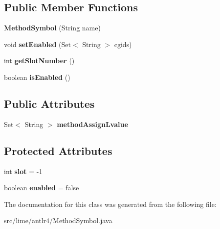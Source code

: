 \subsection*{Public Member Functions}
\begin{DoxyCompactItemize}
\item 
\mbox{\label{classlime_1_1antlr4_1_1MethodSymbol_aef5560b833c2ba287a4b766de2a9ec62}} 
{\bfseries Method\+Symbol} (String name)
\item 
\mbox{\label{classlime_1_1antlr4_1_1MethodSymbol_ae2a590dd58724fc164ea49115989b15a}} 
void {\bfseries set\+Enabled} (Set$<$ String $>$ cgids)
\item 
\mbox{\label{classlime_1_1antlr4_1_1MethodSymbol_aa6379275becc3c4d8136b96be37a0f9d}} 
int {\bfseries get\+Slot\+Number} ()
\item 
\mbox{\label{classlime_1_1antlr4_1_1MethodSymbol_aaf32f229957e563ceeb098b8b7eb74be}} 
boolean {\bfseries is\+Enabled} ()
\end{DoxyCompactItemize}
\subsection*{Public Attributes}
\begin{DoxyCompactItemize}
\item 
\mbox{\label{classlime_1_1antlr4_1_1MethodSymbol_a4a763796e31c84ebbbbe3220697a33c4}} 
Set$<$ String $>$ {\bfseries method\+Assign\+Lvalue}
\end{DoxyCompactItemize}
\subsection*{Protected Attributes}
\begin{DoxyCompactItemize}
\item 
\mbox{\label{classlime_1_1antlr4_1_1MethodSymbol_af4bccbe42b535402c39faf9f1d68ae76}} 
int {\bfseries slot} = -\/1
\item 
\mbox{\label{classlime_1_1antlr4_1_1MethodSymbol_a316274a24ef39f41ea44c5f02c75032b}} 
boolean {\bfseries enabled} = false
\end{DoxyCompactItemize}


The documentation for this class was generated from the following file\+:\begin{DoxyCompactItemize}
\item 
src/lime/antlr4/Method\+Symbol.\+java\end{DoxyCompactItemize}
